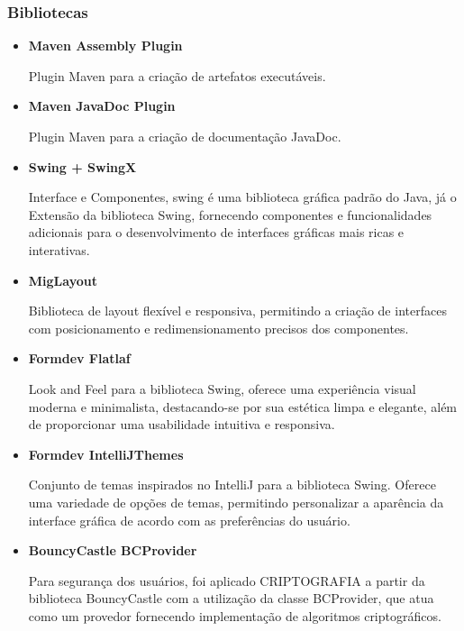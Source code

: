\documentclass[../main.tex]{subfiles}
\begin{document}
\subsubsection{Bibliotecas}
\begin{itemize}
    \item \textbf{Maven Assembly Plugin}

    Plugin Maven para a criação de artefatos executáveis.
    \item \textbf{Maven JavaDoc Plugin}

    Plugin Maven para a criação de documentação JavaDoc.
    \item \textbf{Swing + SwingX}

    Interface e Componentes, swing é uma biblioteca gráfica padrão do Java, já o Extensão da biblioteca Swing, fornecendo componentes e funcionalidades adicionais para o desenvolvimento de interfaces gráficas mais ricas e interativas. 
    \item \textbf{MigLayout}

    Biblioteca de layout flexível e responsiva, permitindo a criação de interfaces com posicionamento e redimensionamento precisos dos componentes.
    \item \textbf{Formdev Flatlaf}

    Look and Feel para a biblioteca Swing, oferece uma experiência visual moderna e minimalista, destacando-se por sua estética limpa e elegante, além de proporcionar uma usabilidade intuitiva e responsiva.
    \item \textbf{Formdev IntelliJThemes}

    Conjunto de temas inspirados no IntelliJ para a biblioteca Swing. Oferece uma variedade de opções de temas, permitindo personalizar a aparência da interface gráfica de acordo com as preferências do usuário.
    \item \textbf{BouncyCastle BCProvider }

    Para segurança dos usuários, foi aplicado CRIPTOGRAFIA a partir da biblioteca BouncyCastle com a utilização da classe BCProvider, que atua como um provedor fornecendo implementação de algoritmos criptográficos.
\end{itemize}

\end{document}
